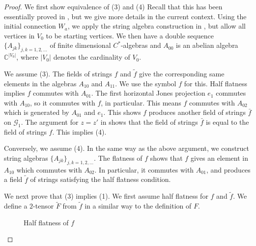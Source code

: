 \documentclass[12pt]{article}
\begin{document}
\begin{proof}

We first show equivalence of (3) and (4)
Recall that this has been essentially
proved in \cite[pages 563--564]{EK1}, but we give more
details in the current context.
Using the initial connection $W_a$, we apply the
string algebra construction in \cite[Section 11.3]{EK1},
but allow all vertices in $V_0$ to be starting vertices.
We then have a double sequence $\{A_{jk}\}_{j,k=1,2,\dots}$
of finite dimensional $C^*$-algebras and $A_{00}$
is an abelian algebra $\mathbb{C}^{|V_0|}$, where
$|V_0|$ denotes the cardinality of $V_0$.  

We assume (3).  The fields of strings $f$ and $\tilde f$
give the corresponding same elements in the algebras $A_{10}$
and $A_{11}$.  We use the symbol $f$ for this.  
Half flatness implies $f$ commutes with $A_{01}$.
The first horizontal Jones projection $e_1$ commutes with
$A_{10}$, so it commutes with $f$, in particular.  This
means $f$ commutes with $A_{02}$ which is generated by
$A_{01}$ and $e_1$.  This shows $f$ produces another
field of strings $\bar f$ on $\mathcal{G}_1$.  The
argument for $z=z'$ in \cite[Fig.~11.16]{EK1} shows
that the field of strings $\bar f$ is equal to the
field of strings $f$.  This implies (4).

Conversely, we assume (4).  In the same way as the
above argument, we construct string algebras 
$\{A_{jk}\}_{j,k=1,2,\dots}$.  The flatness of
$f$ shows that $f$ gives an element in $A_{10}$ which
commutes with $A_{02}$.  In particular, it commutes with
$A_{01}$, and produces a field $\tilde f$ of strings
satisfying the half flatness condition.

We next prove that (3) implies (1).
We first assume half flatness for $f$ and $\tilde f$.
We define a $2$-tensor $\tilde F$ from $\tilde f$ in
a similar way to the definition of $F$.

\begin{figure}[H]
\begin{center}
\caption{Half flatness of $f$}
\label{halfflatf}
\end{center}
\end{figure}


\end{proof}
\end{document}
